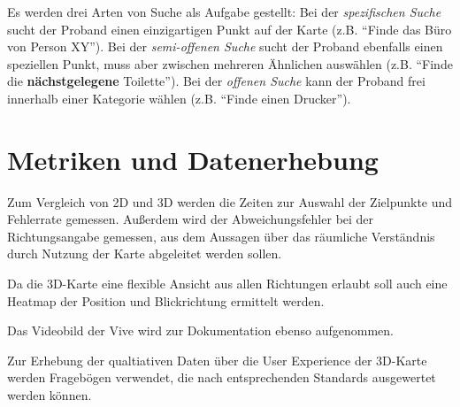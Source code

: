 \documentclass[
    draft=false,
    paper=a4,
    fontsize=11pt,
    twoside=false,
    captions=tableheading,
    british, ngerman,
]{scrartcl}
\begin{document}
Es werden drei Arten von Suche als Aufgabe gestellt:
Bei der \emph{spezifischen Suche} sucht der Proband einen einzigartigen Punkt auf der Karte (z.B. \enquote{Finde das Büro von Person XY}).
Bei der \emph{semi-offenen Suche} sucht der Proband ebenfalls einen speziellen Punkt, muss aber zwischen mehreren Ähnlichen auswählen (z.B. \enquote{Finde die \textbf{nächstgelegene} Toilette}).
Bei der \emph{offenen Suche} kann der Proband frei innerhalb einer Kategorie wählen (z.B. \enquote{Finde einen Drucker}).

\section*{Metriken und Datenerhebung}
Zum Vergleich von 2D und 3D werden die Zeiten zur Auswahl der Zielpunkte und Fehlerrate gemessen.
Außerdem wird der Abweichungsfehler bei der Richtungsangabe gemessen, aus dem Aussagen über das räumliche Verständnis durch Nutzung der Karte abgeleitet werden sollen.

Da die 3D-Karte eine flexible Ansicht aus allen Richtungen erlaubt soll auch eine Heatmap der Position und Blickrichtung ermittelt werden.

Das Videobild der Vive wird zur Dokumentation ebenso aufgenommen.

Zur Erhebung der qualtiativen Daten über die User Experience der 3D-Karte werden Fragebögen verwendet, die nach entsprechenden Standards ausgewertet werden können.
\end{document}
